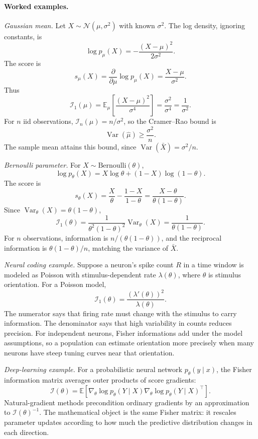 \paragraph{Worked examples.}
\emph{Gaussian mean.}
Let \(X\sim\mathcal N(\mu,\sigma^2)\) with known \(\sigma^2\). The log density, ignoring constants, is
\[
\log p_\mu(X)=-\frac{(X-\mu)^2}{2\sigma^2}.
\]
The score is
\[
s_\mu(X)=\frac{\partial}{\partial\mu}\log p_\mu(X)=\frac{X-\mu}{\sigma^2}.
\]
Thus
\[
\mathcal I_1(\mu)
=\mathbb E_\mu\!\left[\frac{(X-\mu)^2}{\sigma^4}\right]
=\frac{\sigma^2}{\sigma^4}
=\frac{1}{\sigma^2}.
\]
For \(n\) iid observations, \(\mathcal I_n(\mu)=n/\sigma^2\), so the Cramer--Rao bound is
\[
\operatorname{Var}(\hat\mu)\geq\frac{\sigma^2}{n}.
\]
The sample mean attains this bound, since \(\operatorname{Var}(\bar X)=\sigma^2/n\).

\emph{Bernoulli parameter.}
For \(X\sim\mathrm{Bernoulli}(\theta)\),
\[
\log p_\theta(X)=X\log\theta+(1-X)\log(1-\theta).
\]
The score is
\[
s_\theta(X)=\frac{X}{\theta}-\frac{1-X}{1-\theta}
=\frac{X-\theta}{\theta(1-\theta)}.
\]
Since \(\operatorname{Var}_\theta(X)=\theta(1-\theta)\),
\[
\mathcal I_1(\theta)
=\frac{1}{\theta^2(1-\theta)^2}\operatorname{Var}_\theta(X)
=\frac{1}{\theta(1-\theta)}.
\]
For \(n\) observations, information is \(n/(\theta(1-\theta))\), and the reciprocal information is \(\theta(1-\theta)/n\), matching the variance of \(\bar X\).

\emph{Neural coding example.}
Suppose a neuron's spike count \(R\) in a time window is modeled as Poisson with stimulus-dependent rate \(\lambda(\theta)\), where \(\theta\) is stimulus orientation. For a Poisson model,
\[
\mathcal I_1(\theta)
=\frac{(\lambda'(\theta))^2}{\lambda(\theta)}.
\]
The numerator says that firing rate must change with the stimulus to carry information. The denominator says that high variability in counts reduces precision. For independent neurons, Fisher informations add under the model assumptions, so a population can estimate orientation more precisely when many neurons have steep tuning curves near that orientation.

\emph{Deep-learning example.}
For a probabilistic neural network \(p_\theta(y\mid x)\), the Fisher information matrix averages outer products of score gradients:
\[
\mathcal I(\theta)
=\mathbb E\!\left[
\nabla_\theta\log p_\theta(Y\mid X)
\nabla_\theta\log p_\theta(Y\mid X)^\top
\right].
\]
Natural-gradient methods precondition ordinary gradients by an approximation to \(\mathcal I(\theta)^{-1}\). The mathematical object is the same Fisher matrix: it rescales parameter updates according to how much the predictive distribution changes in each direction.

